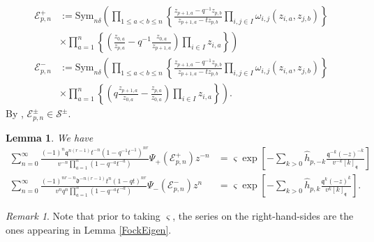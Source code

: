 \documentclass{amsart}
\newcommand{\qqq}{\mathfrak{q}}
\newcommand{\ddd}{\mathfrak{d}}
\newtheorem{lem}[thm]{Lemma}
\theoremstyle{remark}
\newtheorem{rem}[thm]{Remark}
\numberwithin{thm}{section}
\numberwithin{equation}{section}
\begin{document}
\begin{equation}
\begin{aligned}
\mathcal{E}_{p,n}^+&:=
\mathrm{Sym}_{n\delta}\left( \prod_{1\le a<b\le n}\left\{\frac{z_{p+1,a}-q^{-1}z_{p,b}}{z_{p+1,a}-tz_{p,b}}\prod_{i,j\in I}\omega_{i,j}\left( z_{i,a},z_{j,b} \right)\right\}\right.\\
&\times \left.\prod_{a=1}^n\left\{\left( \frac{z_{0,a}}{z_{p,a}}-q^{-1}\frac{z_{0,a}}{z_{p+1,a}} \right)\prod_{i\in I}z_{i,a}  \right\} \right)\\
\mathcal{E}_{p,n}^-&:=
\mathrm{Sym}_{n\delta}\left( \prod_{1\le a<b\le n}\left\{\frac{z_{p+1,a}-q^{-1}z_{p,b}}{z_{p+1,a}-tz_{p,b}}\prod_{i,j\in I}\omega_{i,j}\left( z_{i,a},z_{j,b} \right)\right\}\right.\\
&\times \left.\prod_{a=1}^n\left\{\left( q\frac{z_{p+1,a}}{z_{0,a}}-\frac{z_{p,a}}{z_{0,a}} \right)\prod_{i\in I}z_{i,a}  \right\} \right).
\end{aligned}
\label{Epn}
\end{equation}
By \cite[Proposition 4.22]{Wen}, $\mathcal{E}_{p,n}^\pm\in\mathcal{S}^\pm$.
\begin{lem}\label{EpnShuff}
We have
\begin{align*}
\sum_{n=0}^\infty \frac{(-1)^{n}\qqq^{n(r-1)}t^{-n}(1-q^{-1}t^{-1})^{nr}}{v^{-n}\prod_{a=1}^n(1-q^{-a}t^{-a})}\Psi_+\left( \mathcal{E}_{p,n}^+ \right)z^{-n} 
&= \varsigma\exp\left[-\sum_{k>0}\hat{h}_{p,-k}\frac{\qqq^{-k} (-z)^{-k}}{v^{- k}[ k]_{\qqq}} \right] \\
\sum_{n=0}^\infty \frac{(-1)^{nr-n}\ddd^{-n(r-1)}t^n(1-qt)^{nr}}{v^{n}q^n\prod_{a=1}^n(1-q^{-a}t^{-a})}\Psi_-\left( \mathcal{E}_{p,n}^- \right)z^n 
&= \varsigma\exp\left[-\sum_{k>0}\hat{h}_{p,k}\frac{\qqq^{ k} (-z)^{ k}}{v^{ k}[ k]_{\qqq}} \right].
\end{align*}
\end{lem}

\begin{rem}
    Note that prior to taking $\varsigma$, the series on the right-hand-sides are the ones appearing in Lemma \ref{FockEigen}.
\end{rem}
\end{document}
